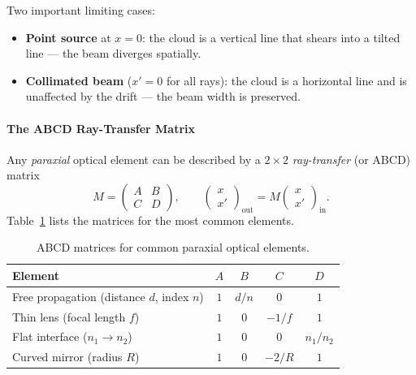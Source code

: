 Two important limiting cases:
\begin{itemize}
  \item \textbf{Point source} at $x=0$: the cloud is a vertical line that shears
        into a tilted line --- the beam diverges spatially.
  \item \textbf{Collimated beam} ($x'=0$ for all rays): the cloud is a horizontal
        line and is unaffected by the drift --- the beam width is preserved.
\end{itemize}

\paragraph{The ABCD Ray-Transfer Matrix}

Any \emph{paraxial} optical element can be described by a $2\times 2$
\emph{ray-transfer} (or ABCD) matrix
\begin{equation}
  M = \begin{pmatrix} A & B \\ C & D \end{pmatrix}, \qquad
  \begin{pmatrix} x \\ x' \end{pmatrix}_{\!\text{out}}
  = M \begin{pmatrix} x \\ x' \end{pmatrix}_{\!\text{in}}.
\end{equation}
Table~\ref{tab:abcd} lists the matrices for the most common elements.

\begin{table}[h]
  \centering
  \caption{ABCD matrices for common paraxial optical elements.}
  \label{tab:abcd}
  \begin{tabular}{lcccc}
    \toprule
    Element & $A$ & $B$ & $C$ & $D$ \\
    \midrule
    Free propagation (distance $d$, index $n$) & $1$ & $d/n$ & $0$ & $1$ \\
    Thin lens (focal length $f$)               & $1$ & $0$   & $-1/f$ & $1$ \\
    Flat interface ($n_1 \to n_2$)             & $1$ & $0$   & $0$ & $n_1/n_2$ \\
    Curved mirror (radius $R$)                 & $1$ & $0$   & $-2/R$ & $1$ \\
    \bottomrule
  \end{tabular}
\end{table}

